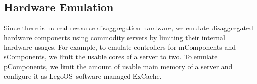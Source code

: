 \documentclass[10pt,times,twocolumn]{z2-article}
\newcommand{\splitkernel}{splitkernel}
\newcommand{\lego}{LegoOS}
\newcommand{\excache}{ExCache}
\newcommand{\vicache}{VtmCache}
\newcommand{\pcomponent}{pComponent}
\newcommand{\mcomponent}{mComponent}
\newcommand{\scomponent}{sComponent}
\providecommand{\DIFdelbegin}{} %
\providecommand{\DIFdelend}{} %
\newcommand{\DIFscaledelfig}{0.5}
\newlength{\DIFdelgraphicswidth} %
\newlength{\DIFdelgraphicsheight} %
\newcommand{\DIFdelincludegraphics}[2][]{%
\sbox{\DIFdelgraphicsbox}{\DIFOincludegraphics[#1]{#2}}%
\settoboxwidth{\DIFdelgraphicswidth}{\DIFdelgraphicsbox} %
\settoboxtotalheight{\DIFdelgraphicsheight}{\DIFdelgraphicsbox} %
\scalebox{\DIFscaledelfig}{%
\parbox[b]{\DIFdelgraphicswidth}{\usebox{\DIFdelgraphicsbox}\\[-\baselineskip] \rule{\DIFdelgraphicswidth}{0em}}\llap{\resizebox{\DIFdelgraphicswidth}{\DIFdelgraphicsheight}{%
\setlength{\unitlength}{\DIFdelgraphicswidth}%
\begin{picture}(1,1)%
\thicklines\linethickness{2pt} %
{\color[rgb]{1,0,0}\put(0,0){\framebox(1,1){}}}%
{\color[rgb]{1,0,0}\put(0,0){\line( 1,1){1}}}%
{\color[rgb]{1,0,0}\put(0,1){\line(1,-1){1}}}%
\end{picture}%
}\hspace*{3pt}}} %
} %
\DeclareRobustCommand{\DIFdelbegin}{\DIFOdelbegin \let\includegraphics\DIFdelincludegraphics} %
\DeclareRobustCommand{\DIFdelend}{\DIFOaddend \let\includegraphics\DIFOincludegraphics} %
\begin{document}
{{{{{{{%


\DIFdelend \subsection{Hardware Emulation}
Since there is no real resource disaggregation hardware,
we emulate disaggregated hardware components using commodity servers 
by limiting their internal hardware usages.
For example, to emulate controllers for \mcomponent{}s and \scomponent{}s, 
we limit the usable cores of a server to two.
To emulate \pcomponent{}s, we limit the amount of usable main memory of a server
and configure it as \lego\ software-managed \excache.

\DIFdelbegin %

}}}}}}}
\end{document}
